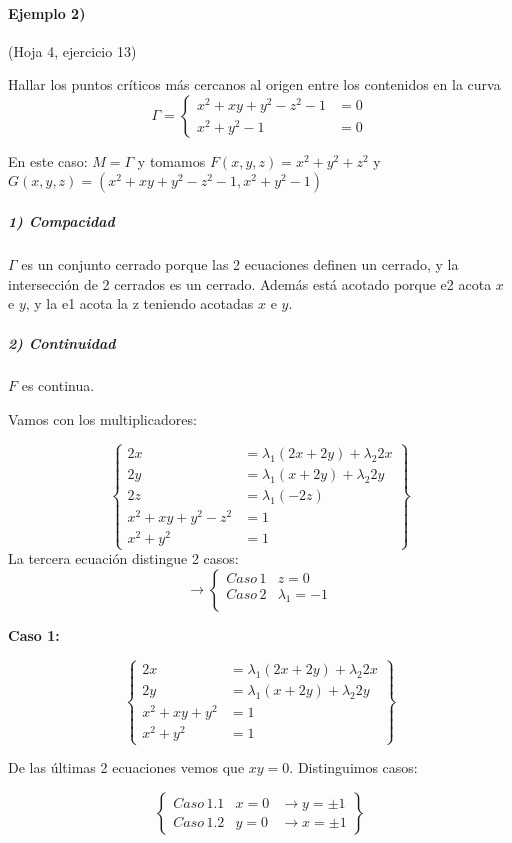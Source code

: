 \paragraph{Ejemplo 2)} (Hoja 4, ejercicio 13)

Hallar los puntos críticos más cercanos al origen entre los contenidos en la curva
\[\Gamma = \left\{ \begin{array}{cc} x^2+xy+y^2-z^2-1&=0\\x^2+y^2-1&=0\end{array}\right.\]

En este caso: $M = \Gamma$ y tomamos $F(x,y,z) = x^2+y^2+z^2$ y $G(x,y,z) = (x^2+xy+y^2-z^2-1,x^2+y^2-1)$

\subparagraph{1) Compacidad}

$\Gamma$ es un conjunto cerrado porque las 2 ecuaciones definen un cerrado, y la intersección de 2 cerrados es un cerrado. Además está acotado porque e2 acota $x$ e $y$, y la e1 acota la z teniendo acotadas $x$ e $y$.

\subparagraph{2) Continuidad}

$F$ es continua.


Vamos con los multiplicadores:

\[
\left\{
\begin{array}{cl}
2x &= \lambda_1(2x+2y)+ \lambda_2 2x\\
2y &= \lambda_1(x+2y) + \lambda_2 2y\\
2z &= \lambda_1(-2z)\\
x^2+xy+y^2-z^2& = 1\\
x^2+y^2 &= 1
\end{array}\right\}\]
La tercera ecuación distingue 2 casos:
\[
\rightarrow
\left\{\begin{array}{cl}
Caso\, 1 &z=0\\
Caso\, 2 &\lambda_1 = -1\\
\end{array}\right.\]

\textbf{Caso 1:}

\[\left\{
\begin{array}{cl}
2x &= \lambda_1(2x+2y) + \lambda_2 2x\\
2y &= \lambda_1(x+2y) + \lambda_2 2y\\
x^2+xy+y^2& = 1\\
x^2+y^2 &= 1
\end{array}\right\}\]

De las últimas 2 ecuaciones vemos que $xy=0$. Distinguimos casos:

\[\left\{\begin{array}{ccc}
Caso\, 1.1& x=0 &\rightarrow y = \pm 1\\
Caso\, 1.2& y=0 &\rightarrow x = \pm 1
\end{array}\right\}\]

